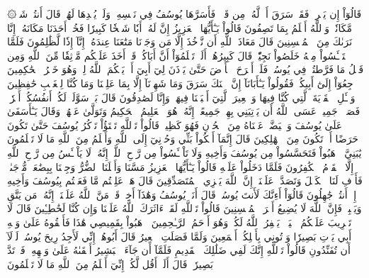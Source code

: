 ۞قَالُوٓاْ إِن يَسۡرِقۡ فَقَدۡ سَرَقَ أَخٞ لَّهُۥ مِن قَبۡلُۚ فَأَسَرَّهَا يُوسُفُ فِي نَفۡسِهِۦ وَلَمۡ يُبۡدِهَا لَهُمۡۚ قَالَ أَنتُمۡ شَرّٞ مَّكَانٗاۖ وَٱللَّهُ أَعۡلَمُ بِمَا تَصِفُونَ
قَالُواْ يَـٰٓأَيُّهَا ٱلۡعَزِيزُ إِنَّ لَهُۥٓ أَبٗا شَيۡخٗا كَبِيرٗا فَخُذۡ أَحَدَنَا مَكَانَهُۥٓۖ إِنَّا نَرَىٰكَ مِنَ ٱلۡمُحۡسِنِينَ
قَالَ مَعَاذَ ٱللَّهِ أَن نَّأۡخُذَ إِلَّا مَن وَجَدۡنَا مَتَٰعَنَا عِندَهُۥٓ إِنَّآ إِذٗا لَّظَٰلِمُونَ
فَلَمَّا ٱسۡتَيۡـَٔسُواْ مِنۡهُ خَلَصُواْ نَجِيّٗاۖ قَالَ كَبِيرُهُمۡ أَلَمۡ تَعۡلَمُوٓاْ أَنَّ أَبَاكُمۡ قَدۡ أَخَذَ عَلَيۡكُم مَّوۡثِقٗا مِّنَ ٱللَّهِ وَمِن قَبۡلُ مَا فَرَّطتُمۡ فِي يُوسُفَۖ فَلَنۡ أَبۡرَحَ ٱلۡأَرۡضَ حَتَّىٰ يَأۡذَنَ لِيٓ أَبِيٓ أَوۡ يَحۡكُمَ ٱللَّهُ لِيۖ وَهُوَ خَيۡرُ ٱلۡحَٰكِمِينَ
ٱرۡجِعُوٓاْ إِلَىٰٓ أَبِيكُمۡ فَقُولُواْ يَـٰٓأَبَانَآ إِنَّ ٱبۡنَكَ سَرَقَ وَمَا شَهِدۡنَآ إِلَّا بِمَا عَلِمۡنَا وَمَا كُنَّا لِلۡغَيۡبِ حَٰفِظِينَ
وَسۡـَٔلِ ٱلۡقَرۡيَةَ ٱلَّتِي كُنَّا فِيهَا وَٱلۡعِيرَ ٱلَّتِيٓ أَقۡبَلۡنَا فِيهَاۖ وَإِنَّا لَصَٰدِقُونَ
قَالَ بَلۡ سَوَّلَتۡ لَكُمۡ أَنفُسُكُمۡ أَمۡرٗاۖ فَصَبۡرٞ جَمِيلٌۖ عَسَى ٱللَّهُ أَن يَأۡتِيَنِي بِهِمۡ جَمِيعًاۚ إِنَّهُۥ هُوَ ٱلۡعَلِيمُ ٱلۡحَكِيمُ
وَتَوَلَّىٰ عَنۡهُمۡ وَقَالَ يَـٰٓأَسَفَىٰ عَلَىٰ يُوسُفَ وَٱبۡيَضَّتۡ عَيۡنَاهُ مِنَ ٱلۡحُزۡنِ فَهُوَ كَظِيمٞ
قَالُواْ تَٱللَّهِ تَفۡتَؤُاْ تَذۡكُرُ يُوسُفَ حَتَّىٰ تَكُونَ حَرَضًا أَوۡ تَكُونَ مِنَ ٱلۡهَٰلِكِينَ
قَالَ إِنَّمَآ أَشۡكُواْ بَثِّي وَحُزۡنِيٓ إِلَى ٱللَّهِ وَأَعۡلَمُ مِنَ ٱللَّهِ مَا لَا تَعۡلَمُونَ
يَٰبَنِيَّ ٱذۡهَبُواْ فَتَحَسَّسُواْ مِن يُوسُفَ وَأَخِيهِ وَلَا تَاْيۡـَٔسُواْ مِن رَّوۡحِ ٱللَّهِۖ إِنَّهُۥ لَا يَاْيۡـَٔسُ مِن رَّوۡحِ ٱللَّهِ إِلَّا ٱلۡقَوۡمُ ٱلۡكَٰفِرُونَ
فَلَمَّا دَخَلُواْ عَلَيۡهِ قَالُواْ يَـٰٓأَيُّهَا ٱلۡعَزِيزُ مَسَّنَا وَأَهۡلَنَا ٱلضُّرُّ وَجِئۡنَا بِبِضَٰعَةٖ مُّزۡجَىٰةٖ فَأَوۡفِ لَنَا ٱلۡكَيۡلَ وَتَصَدَّقۡ عَلَيۡنَآۖ إِنَّ ٱللَّهَ يَجۡزِي ٱلۡمُتَصَدِّقِينَ
قَالَ هَلۡ عَلِمۡتُم مَّا فَعَلۡتُم بِيُوسُفَ وَأَخِيهِ إِذۡ أَنتُمۡ جَٰهِلُونَ
قَالُوٓاْ أَءِنَّكَ لَأَنتَ يُوسُفُۖ قَالَ أَنَا۠ يُوسُفُ وَهَٰذَآ أَخِيۖ قَدۡ مَنَّ ٱللَّهُ عَلَيۡنَآۖ إِنَّهُۥ مَن يَتَّقِ وَيَصۡبِرۡ فَإِنَّ ٱللَّهَ لَا يُضِيعُ أَجۡرَ ٱلۡمُحۡسِنِينَ
قَالُواْ تَٱللَّهِ لَقَدۡ ءَاثَرَكَ ٱللَّهُ عَلَيۡنَا وَإِن كُنَّا لَخَٰطِـِٔينَ
قَالَ لَا تَثۡرِيبَ عَلَيۡكُمُ ٱلۡيَوۡمَۖ يَغۡفِرُ ٱللَّهُ لَكُمۡۖ وَهُوَ أَرۡحَمُ ٱلرَّـٰحِمِينَ
ٱذۡهَبُواْ بِقَمِيصِي هَٰذَا فَأَلۡقُوهُ عَلَىٰ وَجۡهِ أَبِي يَأۡتِ بَصِيرٗا وَأۡتُونِي بِأَهۡلِكُمۡ أَجۡمَعِينَ
وَلَمَّا فَصَلَتِ ٱلۡعِيرُ قَالَ أَبُوهُمۡ إِنِّي لَأَجِدُ رِيحَ يُوسُفَۖ لَوۡلَآ أَن تُفَنِّدُونِ
قَالُواْ تَٱللَّهِ إِنَّكَ لَفِي ضَلَٰلِكَ ٱلۡقَدِيمِ
فَلَمَّآ أَن جَآءَ ٱلۡبَشِيرُ أَلۡقَىٰهُ عَلَىٰ وَجۡهِهِۦ فَٱرۡتَدَّ بَصِيرٗاۖ قَالَ أَلَمۡ أَقُل لَّكُمۡ إِنِّيٓ أَعۡلَمُ مِنَ ٱللَّهِ مَا لَا تَعۡلَمُونَ
